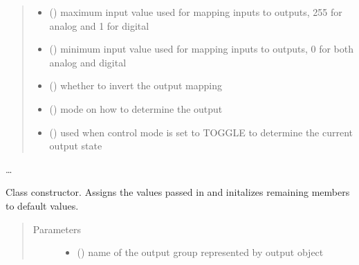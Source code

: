 \documentclass[letterpaper,10pt,english]{sphinxmanual}
\begin{document}
\begin{fulllineitems}
\begin{quote}
\begin{description}
\begin{itemize}
\item {} 
\sphinxAtStartPar
{}() \textendash{} maximum input value used for mapping 
inputs to outputs, 255 for analog and 1 for digital

\item {} 
\sphinxAtStartPar
{}() \textendash{} minimum input value used for mapping 
inputs to outputs, 0 for both analog and digital

\item {} 
\sphinxAtStartPar
{}(\sphinxstyleemphasis{{[}Boolean{]}}) \textendash{} whether to invert the output 
mapping

\item {} 
\sphinxAtStartPar
{}() \textendash{} mode on how to determine 
the output

\item {} 
\sphinxAtStartPar
{}() \textendash{} used when control mode 
is set to TOGGLE to determine the current output state

\end{itemize}

\end{description}\end{quote}

\sphinxAtStartPar
…

\sphinxAtStartPar
{}

\begin{fulllineitems}
\label{\detokenize{generic:DigitalOutputObject.DigitalOutputObject.__init__}}
\sphinxAtStartPar
Class constructor. Assigns the values passed in and initalizes remaining 
members to default values.
\begin{quote}\begin{description}
\item[{Parameters}] \leavevmode\begin{itemize}
\item {} 
\sphinxAtStartPar
{} () \textendash{} name of the output group represented by output object


\end{itemize}
\end{description}
\end{quote}
\end{fulllineitems}
\end{fulllineitems}
\end{document}
